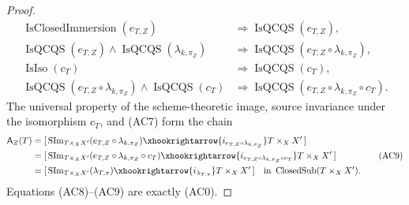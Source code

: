 \begin{proof}
  \[
  \begin{aligned}
    \operatorname{IsClosedImmersion}(e_{T,Z})
      &\Longrightarrow\operatorname{IsQCQS}(e_{T,Z}),\\
    \operatorname{IsQCQS}(e_{T,Z})\wedge
      \operatorname{IsQCQS}(\lambda_{k,\pi_Z})
      &\Longrightarrow
        \operatorname{IsQCQS}(e_{T,Z}\circ\lambda_{k,\pi_Z}),\\
    \operatorname{IsIso}(c_T)
      &\Longrightarrow\operatorname{IsQCQS}(c_T),\\
    \operatorname{IsQCQS}(e_{T,Z}\circ\lambda_{k,\pi_Z})\wedge
      \operatorname{IsQCQS}(c_T)
      &\Longrightarrow
        \operatorname{IsQCQS}
          (e_{T,Z}\circ\lambda_{k,\pi_Z}\circ c_T).
  \end{aligned}                                                     \tag{AC8a}
  \]
  The universal property of the scheme-theoretic image,
  source invariance under the isomorphism $c_T$, and (AC7) form the chain
  \[
  \begin{aligned}
    \mathsf A_Z(T)
      &=[\,\operatorname{SIm}_{T\times_XX'}
          (e_{T,Z}\circ\lambda_{k,\pi_Z})
        \xhookrightarrow{i_{e_{T,Z}\circ\lambda_{k,\pi_Z}}}
          T\times_XX'\,]\\
      &=[\,\operatorname{SIm}_{T\times_XX'}
          (e_{T,Z}\circ\lambda_{k,\pi_Z}\circ c_T)
        \xhookrightarrow{i_{e_{T,Z}\circ\lambda_{k,\pi_Z}\circ c_T}}
          T\times_XX'\,]\\
      &=[\,\operatorname{SIm}_{T\times_XX'}(\lambda_{T,\pi})
        \xhookrightarrow{i_{\lambda_{T,\pi}}}T\times_XX'\,]
      \quad\text{in }\operatorname{ClosedSub}(T\times_XX').
  \end{aligned}                                                   \tag{AC9}
  \]
  Equations (AC8)--(AC9) are exactly (AC0).
\end{proof}

